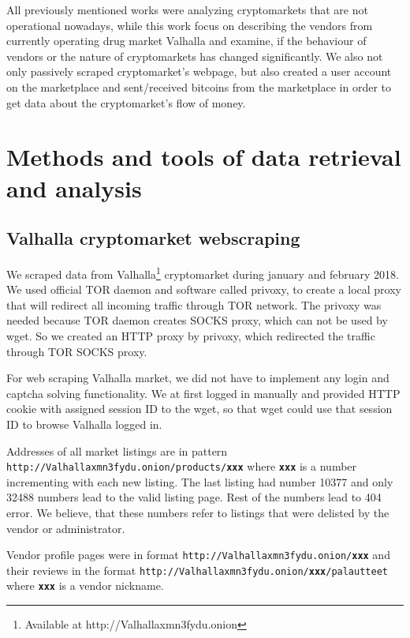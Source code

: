 \documentclass[
  digital, %
  table,   %
  lof,     %
  lot,     %
  oneside
]{fithesis3}
\begin{document}
 All previously mentioned works were analyzing cryptomarkets that are not operational nowadays,
 while this work focus on describing the vendors from currently operating drug market Valhalla 
 and examine, if the behaviour of vendors or the nature of cryptomarkets
 has changed significantly. We also not only passively scraped cryptomarket's webpage,
 but also created a user account on the marketplace and sent/received bitcoins from the marketplace
 in order to get data about the cryptomarket's flow of money.
 
\chapter{Methods and tools of data retrieval and analysis}

\section{Valhalla cryptomarket webscraping}
We scraped data from Valhalla\footnote{Available at http://Valhallaxmn3fydu.onion} cryptomarket
during january and february 2018. 
We used official TOR daemon and software called privoxy, to create a local proxy that will redirect all
incoming traffic through TOR network. The privoxy was needed because TOR daemon creates SOCKS proxy,
which can not be used by wget. So we created an HTTP proxy by privoxy,
which redirected the traffic through TOR SOCKS proxy.

For web scraping Valhalla market,
we did not have to implement any login and captcha solving functionality.
We at first logged in manually and provided HTTP cookie with assigned session ID to the wget,
so that wget could use that session ID to browse Valhalla logged in.

Addresses of all market listings are in pattern\newline
\texttt{http://Valhallaxmn3fydu.onion/products/\textbf{xxx}} where \texttt{\textbf{xxx}}
is a number incrementing with each new listing.
The last listing had number 10377 and only 32488 numbers lead to the valid listing page.
Rest of the numbers lead to 404 error. We believe,
that these numbers refer to listings that were delisted by the vendor or administrator.

Vendor profile pages were in format \texttt{http://Valhallaxmn3fydu.onion/\textbf{xxx}}
and their reviews in the format
 \texttt{http://Valhallaxmn3fydu.onion/\textbf{xxx}/palautteet} where \texttt{\textbf{xxx}}
is a vendor nickname. 
 
\end{document}
